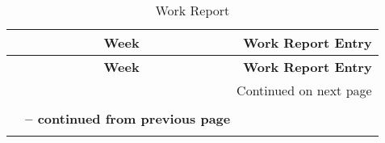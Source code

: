 \begin{center}
\begin{longtable}{|c|p{12cm}|}

\hline \multicolumn{1}{|c|}{\textbf{Week}} & \multicolumn{1}{c|}{\textbf{Work Report Entry} \label{table:journal}} \\ \hline
\endfirsthead

\hline \multicolumn{1}{|c|}{\textbf{Week}} &
\multicolumn{1}{c|}{\textbf{Work Report Entry}} \\
\endhead

\hline \multicolumn{2}{|r|}{{Continued on next page}} \\ \hline
\caption[Work Report]{Work Report} \\
\endfoot

\multicolumn{2}{c}%
{{\bfseries \tablename\ \thetable{} -- continued from previous page}} \\
\endlastfoot


\end{longtable}
\end{center}

